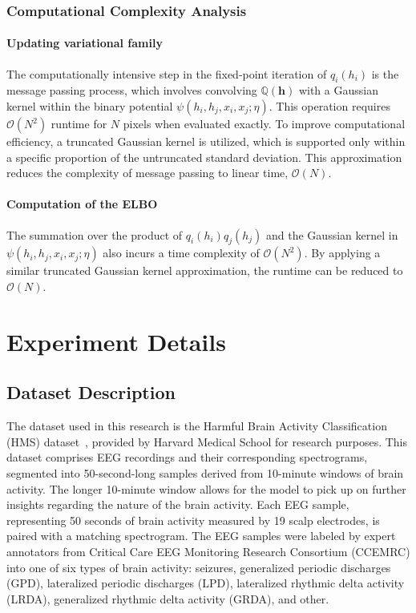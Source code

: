 \documentclass[conference]{IEEEtran}
\newcommand{\hb}{\mathbf{h}}
\newcommand{\QQ}{{\mathbb{Q}}}
\newcommand{\Oc}{\mathcal{O}}
\let\oldsubsubsection\subsubsection
\renewcommand{\subsubsection}[1]{\oldsubsubsection{\textbf{#1}}}
\begin{document}
\subsubsection{Computational Complexity Analysis}


\paragraph{Updating variational family}


The computationally intensive step in the fixed-point iteration of $q_i(h_i)$
is the message passing process, which involves convolving $\QQ(\hb)$ with a
Gaussian kernel within the binary potential $\psi(h_i, h_j, x_i, x_j; \eta)$.
This operation requires $\Oc(N^2)$ runtime for $N$ pixels when evaluated
exactly. To improve computational efficiency, a truncated Gaussian kernel is
utilized, which is supported only within a specific proportion of the
untruncated standard deviation. This approximation reduces the complexity of 
message passing to linear time, $\Oc(N)$.


\paragraph{Computation of the ELBO}


The summation over the product of $q_i(h_i)q_j(h_j)$ and the Gaussian kernel
in $\psi(h_i, h_j, x_i, x_j; \eta)$ also incurs a time complexity of $\Oc(N^2)$.
By applying a similar truncated Gaussian kernel approximation, the runtime can
be reduced to $\Oc(N)$.


\section{Experiment Details}


\subsection{Dataset Description}


The dataset used in this research is the Harmful Brain Activity Classification
(HMS) dataset~\citep{jing2023development}, provided by Harvard Medical School
for research purposes. This dataset comprises EEG recordings and their
corresponding spectrograms, segmented into 50-second-long samples derived from
10-minute windows of brain activity.
The longer 10-minute window allows for the model to pick up on further insights
regarding the nature of the brain activity. Each EEG sample, representing 50
seconds of brain activity measured by 19 scalp electrodes, is paired with a
matching spectrogram.
The EEG samples were labeled by expert annotators from Critical Care EEG
Monitoring Research Consortium (CCEMRC) into one of six types of brain
activity: seizures, generalized periodic discharges (GPD), lateralized
periodic discharges (LPD), lateralized rhythmic delta activity (LRDA),
generalized rhythmic delta activity (GRDA), and other.
\end{document}
